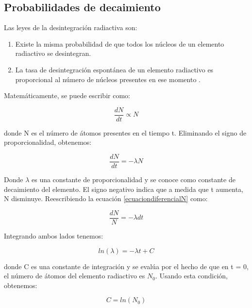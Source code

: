 \subsection{Probabilidades de decaimiento}

\noindent Las leyes de la desintegración radiactiva son: 
\begin{enumerate}
    \item Existe la misma probabilidad de que todos los núcleos de un elemento radiactivo se desintegran. 
 	
    \item La tasa de desintegración espontánea de un elemento radiactivo es proporcional al número de núcleos presentes en ese momento \cite{Krane.1987}.
 	
\end{enumerate}

\noindent Matemáticamente, se puede escribir como: 

\begin{equation}
    \frac{dN}{dt} \propto N
\end{equation}

\noindent donde N es el número de átomos presentes en el tiempo t. Eliminando el signo de proporcionalidad, obtenemos: 

\begin{equation}
\frac{dN}{dt} = -\lambda N\label{ecuaciondiferencialN}
\end{equation} 

\noindent Donde $\lambda $ es una constante de proporcionalidad y se conoce como constante de decaimiento del elemento. El signo negativo indica que a medida que t aumenta, N disminuye. Reescribiendo la ecuación \ref{ecuaciondiferencialN} como: 

\begin{equation}
\frac{dN}{N} = -\lambda dt
\end{equation} 

\noindent Integrando ambos lados tenemos: 

\begin{equation}
ln( \lambda ) = -\lambda t + C\label{ecuacionlambda}
\end{equation}

\noindent donde C es una constante de integración y se evalúa por el hecho de que en t = 0, el número de átomos del elemento radiactivo es $N_0$. Usando esta condición, obtenemos: 

\begin{equation}
    C = ln (N_0)
\end{equation}

